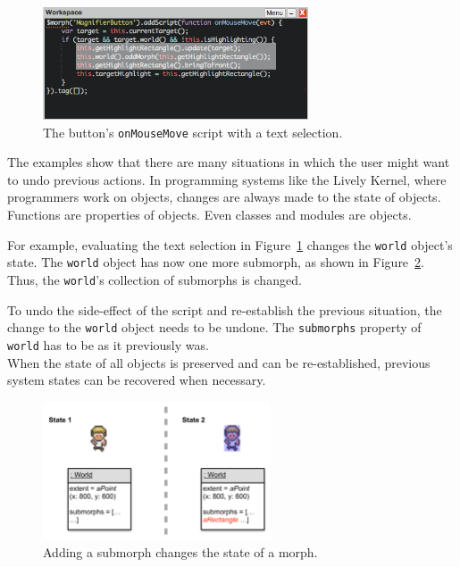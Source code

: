 \begin{figure}[h]
    \centering
    \includegraphics[width=0.7\textwidth]{figures/3_motivation/4_workspaceDoIt.png}
    \caption{The button's \lstinline{onMouseMove} script with a text selection.}
    \label{fig:onMouseOverScript}
\end{figure}

The examples show that there are many situations in which the user might want to undo previous actions.
In programming systems like the Lively Kernel, where programmers work on objects, changes are always made to the state of objects.
Functions are properties of objects.
Even classes and modules are objects.

For example, evaluating the text selection in Figure~\ref{fig:onMouseOverScript} changes the \lstinline{world} object's state.
The \lstinline{world} object has now one more submorph, as shown in Figure~\ref{fig:changedCharacter}.
Thus, the \lstinline{world}'s collection of submorphs is changed.

To undo the side-effect of the script and re-establish the previous situation, the change to the \lstinline{world} object needs to be undone.
The \lstinline{submorphs} property of \lstinline{world} has to be as it previously was.\\
When the state of all objects is preserved and can be re-established, previous system states can be recovered when necessary.

\begin{figure}[h]
    \centering
    \includegraphics[width=0.6\textwidth]{figures/3_motivation/5_stateChanges.pdf}
    \caption{Adding a submorph changes the state of a morph.}
    \label{fig:changedCharacter}
\end{figure}
